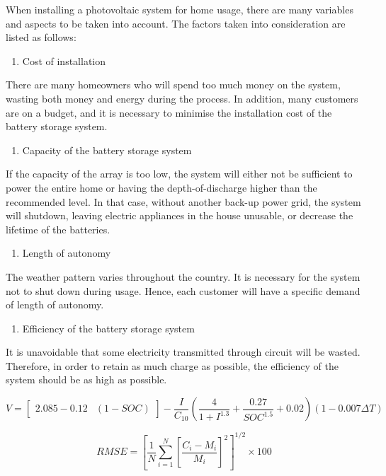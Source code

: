 When installing a photovoltaic system for home usage, there are many variables and aspects to be taken into account. The factors taken into consideration are listed as follows:

\begin{enumerate}
    \item Cost of installation
\end{enumerate}
There are many homeowners who will spend too much money on the system, wasting both money and energy during the process. In addition, many customers are on a budget, and it is necessary to minimise the installation cost of the battery storage system.
\begin{enumerate}[resume]
    \item Capacity of the battery storage system
\end{enumerate}
If the capacity of the array is too low, the system will either not be sufficient to power the entire home or having the depth-of-discharge higher than the recommended level. In that case, without another back-up power grid, the system will shutdown, leaving electric appliances in the house unusable, or decrease the lifetime of the batteries.
\begin{enumerate}[resume]
    \item Length of autonomy
\end{enumerate}
The weather pattern varies throughout the country. It is necessary for the system not to shut down during usage. Hence, each customer will have a specific demand of length of autonomy.
\begin{enumerate}[resume]
    \item Efficiency of the battery storage system
\end{enumerate}
It is unavoidable that some electricity transmitted through circuit will be wasted. Therefore, in order to retain as much charge as possible, the efficiency of the system should be as high as possible.

$$V=\left[\begin{array}{ll}2.085-0.12 & (1-S O C)\end{array}\right]-\frac{I}{C_{10}}\left(\frac{4}{1+I^{1.3}}+\frac{0.27}{S O C^{1.5}}+0.02\right)(1-0.007 \Delta T)$$

$$R M S E=\left[\frac{1}{N} \sum_{i=1}^{N}\left[\frac{C_{i}-M_{i}}{M_{i}}\right]^{2}\right]^{1 / 2} \times 100$$